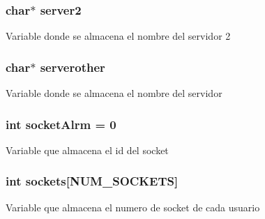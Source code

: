 \subsubsection[{server2}]{\setlength{\rightskip}{0pt plus 5cm}char$\ast$ server2}\label{_g-2361-06-_p1-_server_8c_a70dd311bef3d0b4160a7ce0706f8f4cc}
Variable donde se almacena el nombre del servidor 2 \hypertarget{_g-2361-06-_p1-_server_8c_ae6eaaf28b08889a7ec2359f8968d796c}{}
\subsubsection[{serverother}]{\setlength{\rightskip}{0pt plus 5cm}char$\ast$ serverother}\label{_g-2361-06-_p1-_server_8c_ae6eaaf28b08889a7ec2359f8968d796c}
Variable donde se almacena el nombre del servidor \hypertarget{_g-2361-06-_p1-_server_8c_a882bc4c5a2b02dd85d4716961c4d902f}{}
\subsubsection[{socket\+Alrm}]{\setlength{\rightskip}{0pt plus 5cm}int socket\+Alrm = 0}\label{_g-2361-06-_p1-_server_8c_a882bc4c5a2b02dd85d4716961c4d902f}
Variable que almacena el id del socket \hypertarget{_g-2361-06-_p1-_server_8c_a7724e53f22e431d1ecb6516951a172e1}{}
\subsubsection[{sockets}]{\setlength{\rightskip}{0pt plus 5cm}int sockets\mbox{[}{\bf N\+U\+M\+\_\+\+S\+O\+C\+K\+E\+T\+S}\mbox{]}}\label{_g-2361-06-_p1-_server_8c_a7724e53f22e431d1ecb6516951a172e1}
Variable que almacena el numero de socket de cada usuario \hypertarget{_g-2361-06-_p1-_server_8c_a23b26cdb3a71f525caf03b57f68d47fa}{}
